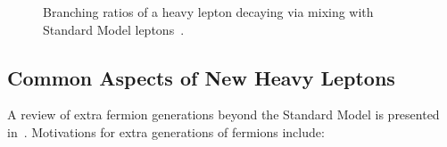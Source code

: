 \begin{figure}[h]
  \centering
  \caption{Branching ratios of a heavy lepton decaying via mixing with Standard Model leptons~\cite{Biggio:2011ja}.}
  \label{fig:branching-ratios}
\end{figure}




\subsection{Common Aspects of New Heavy Leptons}
A review of extra fermion generations beyond the Standard Model is presented in~\cite{Frampton:1999xi}. Motivations for extra generations of fermions include:

